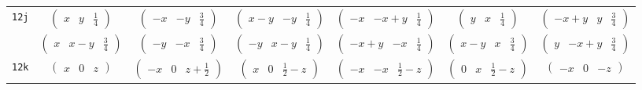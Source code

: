\documentclass[fleqn,9pt,landscape]{jsarticle}
\begin{document}
\begin{center}
\begin{longtable}{ccccccc}
{\tt 12j} & $ \begin{pmatrix} x & y & \frac{1}{4} \end{pmatrix} $ & $ \begin{pmatrix} - x & - y & \frac{3}{4} \end{pmatrix} $ & $ \begin{pmatrix} x - y & - y & \frac{1}{4} \end{pmatrix} $ & $ \begin{pmatrix} - x & - x + y & \frac{1}{4} \end{pmatrix} $ & $ \begin{pmatrix} y & x & \frac{1}{4} \end{pmatrix} $ & $ \begin{pmatrix} - x + y & y & \frac{3}{4} \end{pmatrix} $ \\
& $ \begin{pmatrix} x & x - y & \frac{3}{4} \end{pmatrix} $ & $ \begin{pmatrix} - y & - x & \frac{3}{4} \end{pmatrix} $ & $ \begin{pmatrix} - y & x - y & \frac{1}{4} \end{pmatrix} $ & $ \begin{pmatrix} - x + y & - x & \frac{1}{4} \end{pmatrix} $ & $ \begin{pmatrix} x - y & x & \frac{3}{4} \end{pmatrix} $ & $ \begin{pmatrix} y & - x + y & \frac{3}{4} \end{pmatrix} $ \\ \hline
{\tt 12k} & $ \begin{pmatrix} x & 0 & z \end{pmatrix} $ & $ \begin{pmatrix} - x & 0 & z + \frac{1}{2} \end{pmatrix} $ & $ \begin{pmatrix} x & 0 & \frac{1}{2} - z \end{pmatrix} $ & $ \begin{pmatrix} - x & - x & \frac{1}{2} - z \end{pmatrix} $ & $ \begin{pmatrix} 0 & x & \frac{1}{2} - z \end{pmatrix} $ & $ \begin{pmatrix} - x & 0 & - z \end{pmatrix} $ \\

\end{longtable}
\end{center}
\end{document}
